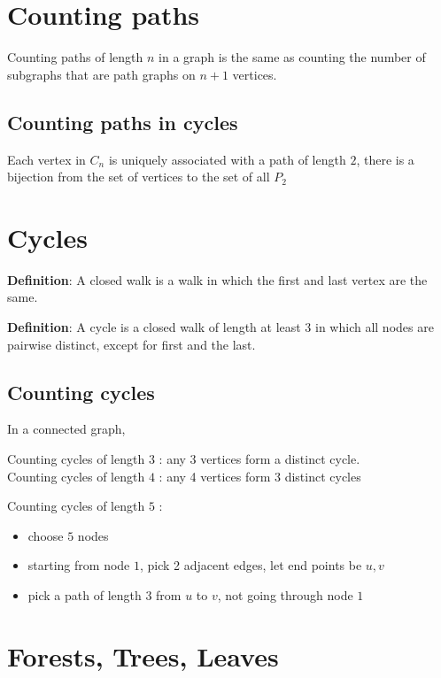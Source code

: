 \section{Counting paths}
Counting paths of length $n$ in a graph is the same as counting the number of subgraphs that are path graphs on $n + 1$ vertices. \\

\subsection{Counting paths in cycles}

Each vertex in $C_n$ is uniquely associated with a path of length $2$, there is a bijection from the set of vertices to the set of all $P_2$

\section{Cycles}
\begin{framed}
   \textbf{Definition}: A closed walk is a walk in which the first and last vertex are the same. 
\end{framed}

\begin{framed}
   \textbf{Definition}: A cycle is a closed walk of length at least 3 in which all nodes are pairwise distinct, except for first and the last.
\end{framed}

\subsection{Counting cycles}

In a connected graph, 

Counting cycles of length $3$ : any 3 vertices form a distinct cycle. \\

Counting cycles of length $4$ : any 4 vertices form 3 distinct cycles

Counting cycles of length $5$ :
\begin{itemize}
   \item choose $5$ nodes
   \item starting from node $1$, pick 2 adjacent edges, let end points be $u, v$
   \item pick a path of length  $3$ from $u$ to $v$, not going through node $1$
\end{itemize}

\section{Forests, Trees, Leaves}

